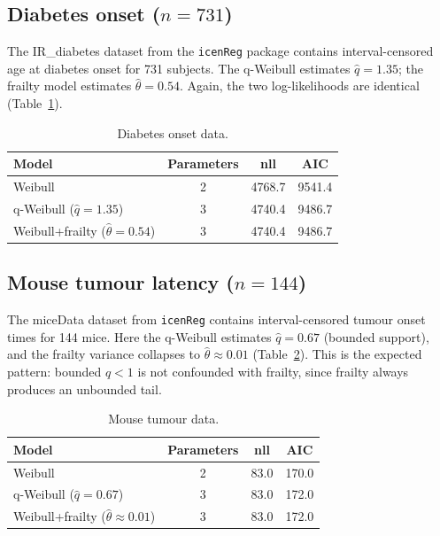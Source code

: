 \documentclass[12pt,a4paper]{article}
\begin{document}
\subsection{Diabetes onset ($n=731$)}

The IR\_diabetes dataset from the \texttt{icenReg} package contains interval-censored age at diabetes onset for 731 subjects. The q-Weibull estimates $\hat q=1.35$; the frailty model estimates $\hat\theta=0.54$. Again, the two log-likelihoods are identical (Table~\ref{tab:diab}).

\begin{table}[ht]
\centering
\caption{Diabetes onset data.}
\begin{tabular}{lccc}
\toprule
Model & Parameters & nll & AIC \\
\midrule
Weibull & 2 & 4768.7 & 9541.4 \\
q-Weibull ($\hat q=1.35$) & 3 & 4740.4 & 9486.7 \\
Weibull+frailty ($\hat\theta=0.54$) & 3 & 4740.4 & 9486.7 \\
\bottomrule
\end{tabular}
\label{tab:diab}
\end{table}

\subsection{Mouse tumour latency ($n=144$)}

The miceData dataset from \texttt{icenReg} contains interval-censored tumour onset times for 144 mice. Here the q-Weibull estimates $\hat q=0.67$ (bounded support), and the frailty variance collapses to $\hat\theta\approx 0.01$ (Table~\ref{tab:mice}). This is the expected pattern: bounded $q<1$ is not confounded with frailty, since frailty always produces an unbounded tail.

\begin{table}[ht]
\centering
\caption{Mouse tumour data.}
\begin{tabular}{lccc}
\toprule
Model & Parameters & nll & AIC \\
\midrule
Weibull & 2 & 83.0 & 170.0 \\
q-Weibull ($\hat q=0.67$) & 3 & 83.0 & 172.0 \\
Weibull+frailty ($\hat\theta\approx 0.01$) & 3 & 83.0 & 172.0 \\
\bottomrule
\end{tabular}
\label{tab:mice}
\end{table}
\end{document}
